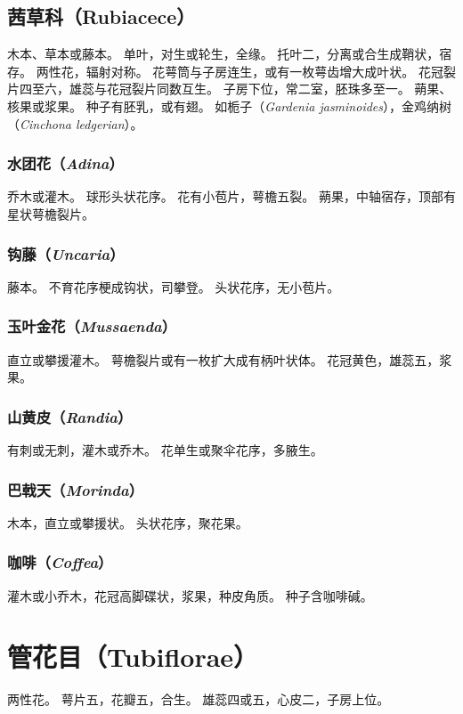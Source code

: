 \documentclass[11pt]{article}
\begin{document}
\begin{sloppypar}
\subsection{茜草科（Rubiacece）}
木本、草本或藤本。
单叶，对生或轮生，全缘。
托叶二，分离或合生成鞘状，宿存。
两性花，辐射对称。
花萼筒与子房连生，或有一枚萼齿增大成叶状。
花冠裂片四至六，雄蕊与花冠裂片同数互生。
子房下位，常二室，胚珠多至一。
蒴果、核果或浆果。
种子有胚乳，或有翅。
如栀子（\textit{Gardenia jasminoides}），金鸡纳树（\textit{Cinchona ledgerian}）。

\subsubsection{水团花（\textit{Adina}）}
乔木或灌木。
球形头状花序。
花有小苞片，萼檐五裂。
蒴果，中轴宿存，顶部有星状萼檐裂片。

\subsubsection{钩藤（\textit{Uncaria}）}
藤本。
不育花序梗成钩状，司攀登。
头状花序，无小苞片。

\subsubsection{玉叶金花（\textit{Mussaenda}）}
直立或攀援灌木。
萼檐裂片或有一枚扩大成有柄叶状体。
花冠黄色，雄蕊五，浆果。

\subsubsection{山黄皮（\textit{Randia}）}
有刺或无刺，灌木或乔木。
花单生或聚伞花序，多腋生。

\subsubsection{巴戟天（\textit{Morinda}）}
木本，直立或攀援状。
头状花序，聚花果。

\subsubsection{咖啡（\textit{Coffea}）}
灌木或小乔木，花冠高脚碟状，浆果，种皮角质。
种子含咖啡碱。

\section{管花目（Tubiflorae）}
两性花。
萼片五，花瓣五，合生。
雄蕊四或五，心皮二，子房上位。


\end{sloppypar}
\end{document}
